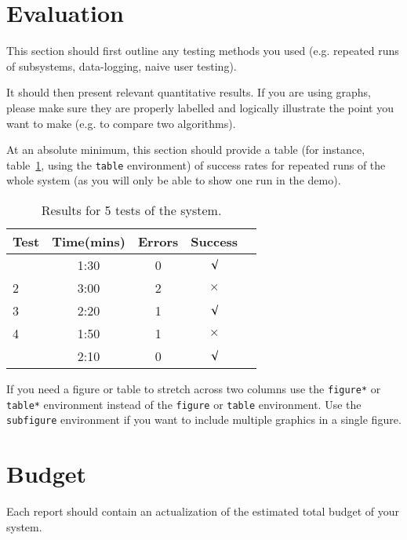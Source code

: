 \documentclass{article}
\begin{document}
\section{Evaluation}

This section should first outline any testing methods you used (e.g. repeated runs of subsystems, data-logging, naive user testing). 

It should then present relevant quantitative results. If you are using graphs, please make sure they are properly labelled and logically illustrate the point you want to make (e.g. to compare two algorithms).

At an absolute minimum, this section should provide a table (for instance, table~\ref{tab:sample-table}, using the \verb+table+ environment) of success rates for repeated runs of the whole system (as you will only be able to show one run in the demo).

\begin{table}[h]
\vskip 3mm
\begin{center}
\begin{small}
\begin{sc}
\begin{tabular}{lcccr}
\hline
\abovespace\belowspace
Test  & Time(mins) & Errors & Success \\
\hline
\abovespace
1    & 1:30 & 0 & $\surd$ \\
2    & 3:00 & 2 & $\times$\\
3    & 2:20 & 1 & $\surd$ \\
4    & 1:50 & 1 & $\times$\\
\belowspace
5    & 2:10 & 0 & $\surd$ \\
\hline
\end{tabular}
\end{sc}
\end{small}
\caption{Results for 5 tests of the system.}
\label{tab:sample-table}
\end{center}
\vskip -3mm
\end{table}

If you need a figure or table to stretch across two columns use the \verb+figure*+ or \verb+table*+ environment instead of the \verb+figure+ or \verb+table+ environment.  Use the \verb+subfigure+ environment if you want to include multiple graphics in a single figure.

\section{Budget}
Each report should contain an actualization of the estimated total budget 
of your system.
\end{document}
